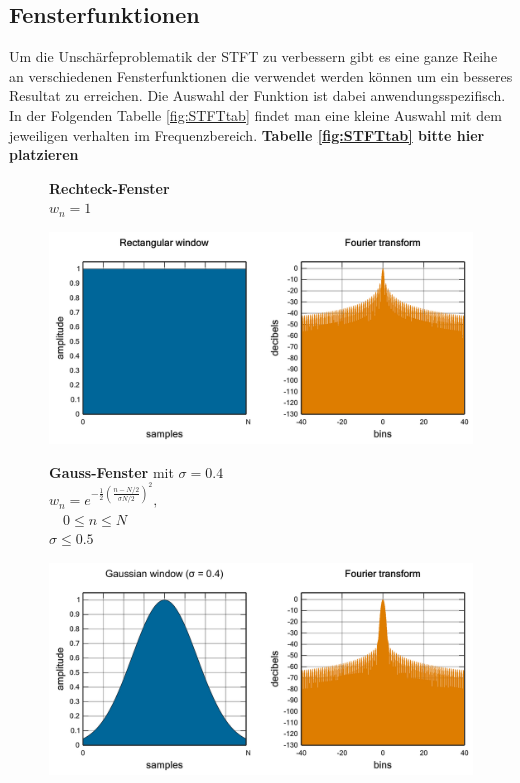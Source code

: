 \subsection{Fensterfunktionen}
Um die Unschärfeproblematik der STFT zu verbessern gibt es eine ganze Reihe an verschiedenen Fensterfunktionen die verwendet werden können um ein besseres Resultat zu erreichen. Die Auswahl der Funktion ist dabei anwendungsspezifisch. In der Folgenden Tabelle \ref{fig:STFTtab} findet man eine kleine Auswahl mit dem jeweiligen verhalten im Frequenzbereich. 
\color{red}\textbf{Tabelle \ref{fig:STFTtab} bitte hier platzieren} \color{black} %

\begin{figure}[!h]
	\begin{minipage}{.4\columnwidth}
		\textbf{Rechteck-Fenster}\\
		$w_{n}=1$
	\end{minipage}%
	\begin{minipage}{.6\columnwidth}
		\centering
		\includegraphics[width=\linewidth]{papers/autotune/sections/fft/images/windows/Rectangular.pdf}
	\end{minipage}


	\begin{minipage}{.4\columnwidth}
		\textbf{Gauss-Fenster} mit $\sigma = 0.4$\\
		$w_{n}=e^{-\frac{1}{2}\left(\frac{n-N / 2}{\sigma N / 2}\right)^{2}},$\\
		$ \quad 0 \leq n \leq N$\\
		$\sigma \leq 0.5$
	\end{minipage}%
	\begin{minipage}{.6\columnwidth}
		\centering
		\includegraphics[width=\linewidth]{papers/autotune/sections/fft/images/windows/Gauss.pdf}
	\end{minipage}



\end{figure}
